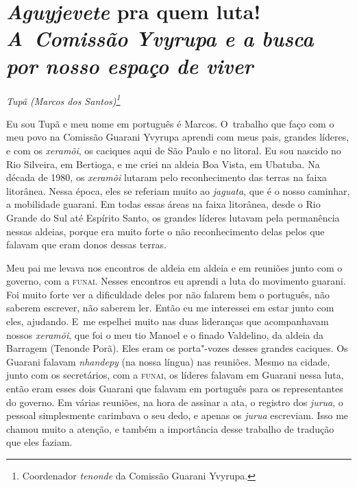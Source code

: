 

\thispagestyle{empty}

\chapter*{\emph{Aguyjevete} pra quem luta!\\
\large{\emph{A~Comissão Yvyrupa e a busca por nosso espaço de viver}}}


\@openrighttrue\makeatother
\begin{flushright}
\emph{Tupã (Marcos dos Santos)\footnote{Coordenador \emph{tenonde} da Comissão
Guarani Yvyrupa.}}
\end{flushright}
\medskip

\noindent
Eu sou Tupã e meu nome em português é Marcos. O~trabalho que faço com o
meu povo na Comissão Guarani Yvyrupa aprendi com meus pais, grandes
líderes, e com os \emph{xeramõi}, os caciques aqui de São Paulo e no litoral.
Eu sou nascido no Rio Silveira, em Bertioga, e me criei na aldeia Boa
Vista, em Ubatuba. Na década de 1980, os \emph{xeramõi} lutaram pelo
reconhecimento das terras na faixa litorânea. Nessa época, eles se
referiam muito ao \emph{jaguata}, que é o nosso caminhar, a mobilidade
guarani. Em todas essas áreas na faixa litorânea, desde o Rio Grande do
Sul até Espírito Santo, os grandes líderes lutavam pela permanência
nessas aldeias, porque era muito forte o não reconhecimento delas pelos
que falavam que eram donos dessas terras. 

Meu pai me levava nos encontros de aldeia em aldeia e em reuniões junto
com o governo, com a \textsc{funai}. Nesses encontros eu aprendi a luta do
movimento guarani. Foi muito forte ver a dificuldade deles por não falarem bem o português,
não saberem escrever, não saberem ler. Então eu me interessei em estar
junto com eles, ajudando. E~me espelhei muito nas duas lideranças que
acompanhavam nossos \emph{xeramõi}, que foi o meu tio Manoel e o finado
Valdelino, da aldeia da Barragem (Tenonde Porã). Eles eram os
porta"-vozes desses grandes caciques. Os Guarani falavam \emph{nhandepy} (na
nossa língua) nas reuniões. Mesmo na cidade, junto com os secretários,
com a \textsc{funai}, os líderes falavam em Guarani nessa luta, então eram esses
dois Guarani que falavam em português para os representantes do
governo. Em várias reuniões, na hora de assinar a ata, o registro dos
\emph{jurua}, o pessoal simplesmente carimbava o seu dedo, e apenas os \emph{jurua}
escreviam. Isso me chamou muito a atenção, e também a importância desse
trabalho de tradução que eles faziam.

